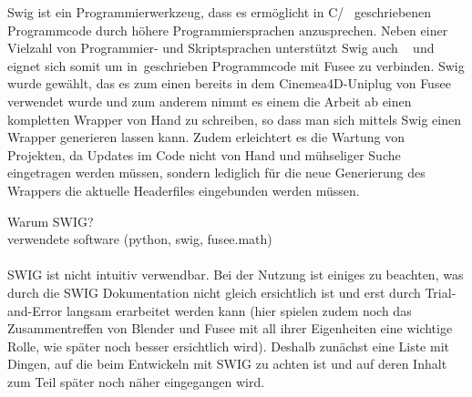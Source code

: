  \label{sec:Umsetzung}


Swig ist ein Programmierwerkzeug, dass es ermöglicht in C/\CC~ geschriebenen Programmcode durch höhere Programmiersprachen anzusprechen. Neben einer Vielzahl von Programmier- und Skriptsprachen unterstützt Swig auch \CS~ und eignet sich somit um in\CC~geschrieben Programmcode mit Fusee zu verbinden. Swig wurde gewählt, das es zum einen bereits in dem Cinemea4D-Uniplug von Fusee verwendet wurde und zum anderem nimmt es einem die Arbeit ab einen kompletten Wrapper von Hand zu schreiben, so dass man sich mittels Swig einen Wrapper generieren lassen kann. Zudem erleichtert es die Wartung von Projekten, da Updates im Code nicht von Hand und mühseliger Suche eingetragen werden müssen, sondern lediglich für die neue Generierung des Wrappers die aktuelle Headerfiles eingebunden werden müssen.

Warum SWIG?\\
verwendete software (python, swig, fusee.math)\\\\

SWIG ist nicht intuitiv verwendbar. Bei der Nutzung ist einiges zu beachten, was durch die SWIG Dokumentation nicht gleich ersichtlich ist und erst durch Trial-and-Error langsam erarbeitet werden kann (hier spielen zudem noch das Zusammentreffen von Blender und Fusee mit all ihrer Eigenheiten eine wichtige Rolle, wie später noch besser ersichtlich wird). Deshalb zunächst eine Liste mit Dingen, auf die beim Entwickeln mit SWIG zu achten ist und auf deren Inhalt zum Teil später noch näher eingegangen wird.


